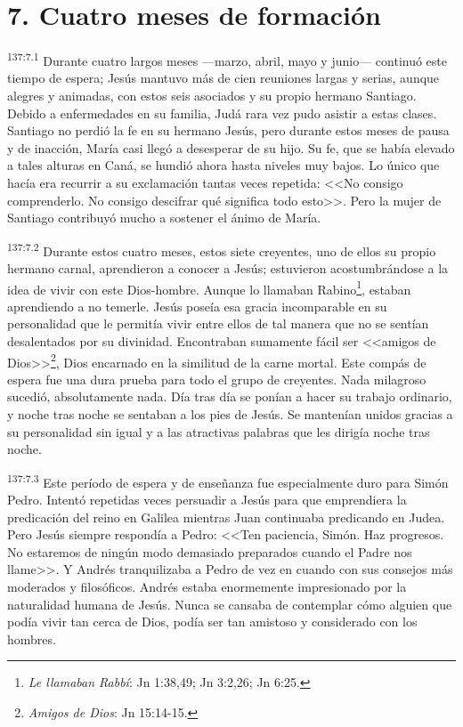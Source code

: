 \section*{7. Cuatro meses de formación}
\par 
\textsuperscript{137:7.1} Durante cuatro largos meses ---marzo, abril, mayo y junio--- continuó este tiempo de espera; Jesús mantuvo más de cien reuniones largas y serias, aunque alegres y animadas, con estos seis asociados y su propio hermano Santiago. Debido a enfermedades en su familia, Judá rara vez pudo asistir a estas clases. Santiago no perdió la fe en su hermano Jesús, pero durante estos meses de pausa y de inacción, María casi llegó a desesperar de su hijo. Su fe, que se había elevado a tales alturas en Caná, se hundió ahora hasta niveles muy bajos. Lo único que hacía era recurrir a su exclamación tantas veces repetida: <<No consigo comprenderlo. No consigo descifrar qué significa todo esto>>. Pero la mujer de Santiago contribuyó mucho a sostener el ánimo de María.

\par 
\textsuperscript{137:7.2} Durante estos cuatro meses, estos siete creyentes, uno de ellos su propio hermano carnal, aprendieron a conocer a Jesús; estuvieron acostumbrándose a la idea de vivir con este Dios-hombre. Aunque lo llamaban Rabino\footnote{\textit{Le llamaban Rabbí}: Jn 1:38,49; Jn 3:2,26; Jn 6:25.}, estaban aprendiendo a no temerle. Jesús poseía esa gracia incomparable en su personalidad que le permitía vivir entre ellos de tal manera que no se sentían desalentados por su divinidad. Encontraban sumamente fácil ser <<amigos de Dios>>\footnote{\textit{Amigos de Dios}: Jn 15:14-15.}, Dios encarnado en la similitud de la carne mortal. Este compás de espera fue una dura prueba para todo el grupo de creyentes. Nada milagroso sucedió, absolutamente nada. Día tras día se ponían a hacer su trabajo ordinario, y noche tras noche se sentaban a los pies de Jesús. Se mantenían unidos gracias a su personalidad sin igual y a las atractivas palabras que les dirigía noche tras noche.

\par 
\textsuperscript{137:7.3} Este período de espera y de enseñanza fue especialmente duro para Simón Pedro. Intentó repetidas veces persuadir a Jesús para que emprendiera la predicación del reino en Galilea mientras Juan continuaba predicando en Judea. Pero Jesús siempre respondía a Pedro: <<Ten paciencia, Simón. Haz progresos. No estaremos de ningún modo demasiado preparados cuando el Padre nos llame>>. Y Andrés tranquilizaba a Pedro de vez en cuando con sus consejos más moderados y filosóficos. Andrés estaba enormemente impresionado por la naturalidad humana de Jesús. Nunca se cansaba de contemplar cómo alguien que podía vivir tan cerca de Dios, podía ser tan amistoso y considerado con los hombres.

